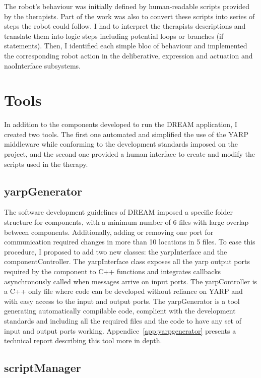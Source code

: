 The robot's behaviour was initially defined by human-readable scripts provided by the therapists. Part of the work was also to convert these scripts into series of steps the robot could follow. I had to interpret the therapists descriptions and translate them into logic steps including potential loops or branches (if statements). Then, I identified each simple bloc of behaviour and implemented the corresponding robot action in the deliberative, expression and actuation and naoInterface subsystems.

\section{Tools}

In addition to the components developed to run the DREAM application, I created two tools. The first one automated and simplified the use of the YARP middleware while conforming to the development standards imposed on the project, and the second one provided a human interface to create and modify the scripts used in the therapy.

\subsection{yarpGenerator}

The software development guidelines of DREAM imposed a specific folder structure for components, with a minimum number of 6 files with large overlap between components. Additionally, adding or removing one port for communication required changes in more than 10 locations in 5 files. To ease this procedure, I proposed to add two new classes: the yarpInterface and the componentController. The yarpInterface class exposes all the yarp output ports required by the component to C++ functions and integrates callbacks asynchronously called when messages arrive on input ports. The yarpController is a C++ only file where code can be developed without reliance on YARP and with easy access to the input and output ports. The yarpGenerator is a tool generating automatically compilable code, complient with the development standards and including all the required files and the code to have any set of input and output ports working. Appendice~\ref{app:yarpgenerator} presents a technical report describing this tool more in depth.

\subsection{scriptManager}

